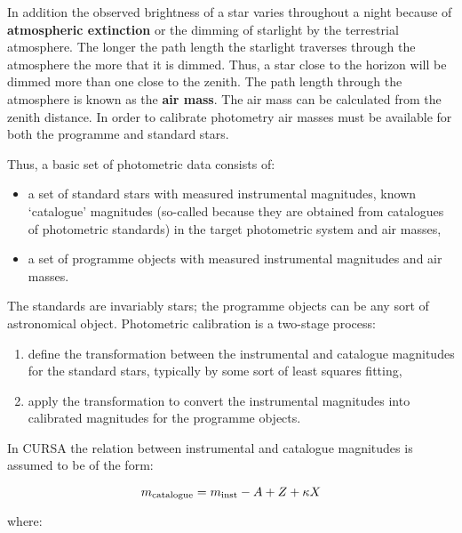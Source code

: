 \documentclass[twoside,11pt]{article}
\renewcommand{\_}{\texttt{\symbol{95}}}
\begin{document}
In addition the observed brightness of a star varies throughout a
night  because of {\bf atmospheric extinction} or the dimming of
starlight by the terrestrial atmosphere.  The longer the path length
the starlight traverses through the atmosphere the more that it is dimmed.
Thus, a star close to the horizon will be dimmed more than one close
to the zenith.  The path length through the atmosphere is known as the
{\bf air mass}.  The air mass can be calculated from the zenith
distance.  In order to calibrate photometry air masses must be available
for both the programme and standard stars.

Thus, a basic set of photometric data consists of:

\begin{itemize}

  \item a set of standard stars with measured instrumental magnitudes,
   known `catalogue' magnitudes (so-called because they are obtained
   from catalogues of photometric standards) in the target photometric
   system and air masses,

  \item a set of programme objects with measured instrumental magnitudes
   and air masses.

\end{itemize}

The standards are invariably stars; the programme objects can be any
sort of astronomical object.  Photometric calibration is a two-stage
process:

\begin{enumerate}

  \item define the transformation between the instrumental and catalogue
   magnitudes for the standard stars, typically by some sort of least
   squares fitting,

  \item apply the transformation to convert the instrumental magnitudes
   into calibrated magnitudes for the programme objects.

\end{enumerate}

In CURSA the relation between instrumental and catalogue magnitudes
is assumed to be of the form:

\begin{equation}
m_{\rm catalogue} = m_{\rm inst} - A + Z + \kappa X
\end{equation}

where:
\end{document}
